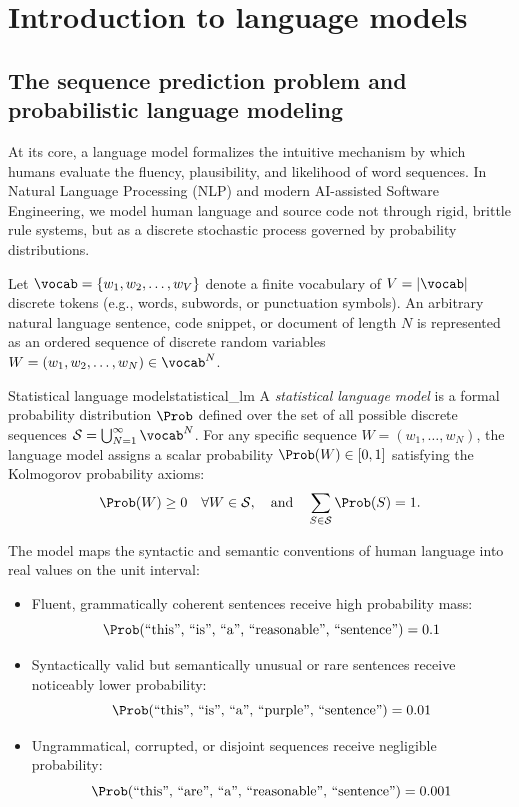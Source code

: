 \documentclass[../../main.tex]{subfiles}
\begin{document}
\chapter{Introduction to language models}
\label{ch:intro_lms}

\section{The sequence prediction problem and probabilistic language modeling}
\label{sec:prob_lm}

At its core, a language model formalizes the intuitive mechanism by which humans evaluate the fluency, plausibility, and likelihood of word sequences. In Natural Language Processing (NLP) and modern AI-assisted Software Engineering, we model human language and source code not through rigid, brittle rule systems, but as a discrete stochastic process governed by probability distributions.

Let $\vocab = \{w_1, w_2, \dots, w_V\}$ denote a finite vocabulary of $V = |\vocab|$ discrete tokens (e.g., words, subwords, or punctuation symbols). An arbitrary natural language sentence, code snippet, or document of length $N$ is represented as an ordered sequence of discrete random variables $W = (w_1, w_2, \dots, w_N) \in \vocab^N$.

\begin{definition}{Statistical language model}{statistical_lm}
A \emph{statistical language model} is a formal probability distribution $\Prob$ defined over the set of all possible discrete sequences $\mathcal{S} = \bigcup_{N=1}^\infty \vocab^N$. For any specific sequence $W = (w_1, \dots, w_N)$, the language model assigns a scalar probability $\Prob(W) \in [0, 1]$ satisfying the Kolmogorov probability axioms:
\begin{equation}
\label{eq:total_prob}
\Prob(W) \ge 0 \quad \forall W \in \mathcal{S}, \quad \text{and} \quad \sum_{S \in \mathcal{S}} \Prob(S) = 1.
\end{equation}
\end{definition}

The model maps the syntactic and semantic conventions of human language into real values on the unit interval:
\begin{itemize}
    \item Fluent, grammatically coherent sentences receive high probability mass:
    \[
    \Prob(\text{``this'', ``is'', ``a'', ``reasonable'', ``sentence''}) = 0.1
    \]
    \item Syntactically valid but semantically unusual or rare sentences receive noticeably lower probability:
    \[
    \Prob(\text{``this'', ``is'', ``a'', ``purple'', ``sentence''}) = 0.01
    \]
    \item Ungrammatical, corrupted, or disjoint sequences receive negligible probability:
    \[
    \Prob(\text{``this'', ``are'', ``a'', ``reasonable'', ``sentence''}) = 0.001
    \]
\end{itemize}
\end{document}
